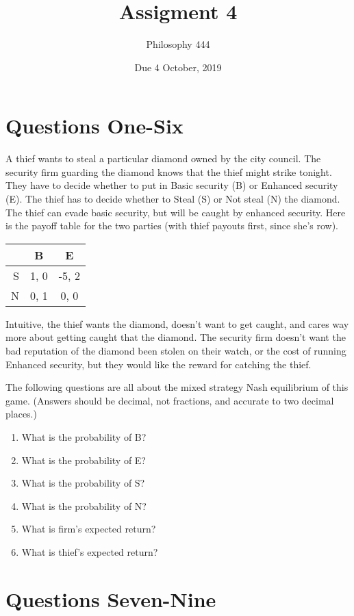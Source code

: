 \documentclass[11pt,]{article}
\title{Assigment 4}
\author{Philosophy 444}
\date{Due 4 October, 2019}
\providecommand{\tightlist}{%
  \setlength{\itemsep}{0pt}\setlength{\parskip}{0pt}}
\begin{document}
\maketitle

\hypertarget{questions-one-six}{%
\section{Questions One-Six}\label{questions-one-six}}

A thief wants to steal a particular diamond owned by the city council.
The security firm guarding the diamond knows that the thief might strike
tonight. They have to decide whether to put in Basic security (B) or
Enhanced security (E). The thief has to decide whether to Steal (S) or
Not steal (N) the diamond. The thief can evade basic security, but will
be caught by enhanced security. Here is the payoff table for the two
parties (with thief payouts first, since she's row).

\begin{longtable}[]{@{}rcc@{}}
\toprule
& B & E\tabularnewline
\midrule
\endhead
S & 1, 0 & -5, 2\tabularnewline
N & 0, 1 & 0, 0\tabularnewline
\bottomrule
\end{longtable}

Intuitive, the thief wants the diamond, doesn't want to get caught, and
cares way more about getting caught that the diamond. The security firm
doesn't want the bad reputation of the diamond been stolen on their
watch, or the cost of running Enhanced security, but they would like the
reward for catching the thief.

The following questions are all about the mixed strategy Nash
equilibrium of this game. (Answers should be decimal, not fractions, and
accurate to two decimal places.)

\begin{enumerate}
\def\labelenumi{\arabic{enumi}.}
\tightlist
\item
  What is the probability of B?
\item
  What is the probability of E?
\item
  What is the probability of S?
\item
  What is the probability of N?
\item
  What is firm's expected return?
\item
  What is thief's expected return?
\end{enumerate}

\hypertarget{questions-seven-nine}{%
\section{Questions Seven-Nine}\label{questions-seven-nine}}
\end{document}
